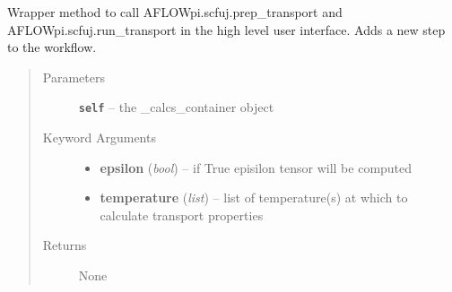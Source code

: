 \documentclass[letterpaper,10pt,english]{sphinxmanual}
\begin{document}
\begin{fulllineitems}
\begin{fulllineitems}
\label{prep:prep.calcs_container.split_chain}
\end{fulllineitems}


\begin{fulllineitems}
\label{prep:prep.calcs_container.submit}
\end{fulllineitems}


\begin{fulllineitems}
\label{prep:prep.calcs_container.transport}
Wrapper method to call AFLOWpi.scfuj.prep\_transport and AFLOWpi.scfuj.run\_transport
in the high level user interface. Adds a new step to the workflow.
\begin{quote}\begin{description}
\item[{Parameters}] \leavevmode
\textbf{\texttt{self}} -- the \_calcs\_container object

\item[{Keyword Arguments}] \leavevmode\begin{itemize}
\item {} 
\textbf{epsilon} (\emph{bool}) --
if True episilon tensor will be computed

\item {} 
\textbf{temperature} (\emph{list}) --
list of temperature(s) at which to calculate transport properties

\end{itemize}

\item[{Returns}] \leavevmode
None

\end{description}\end{quote}

\end{fulllineitems}


\begin{fulllineitems}
\label{prep:prep.calcs_container.values}
\end{fulllineitems}


\begin{fulllineitems}
\label{prep:prep.calcs_container.vcrelax}
\end{fulllineitems}


\end{fulllineitems}
\end{document}
